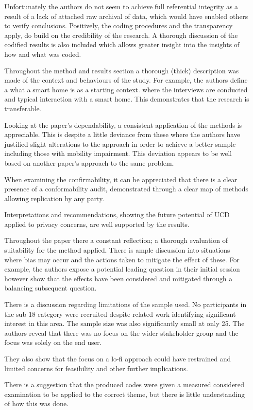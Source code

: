 Unfortunately the authors do not seem to achieve full referential integrity as a result of a lack of attached raw archival of data, which would have enabled others to verify conclusions. Positively, the coding procedures and the transparency apply, do build on the credibility of the research. A thorough discussion of the codified results is also included which allows greater insight into the insights of how and what was coded.


Throughout the method and results section a thorough (thick) description was made of the context and behaviours of the study. For example, the authors define a what a smart home is as a starting context. where the interviews are conducted and typical interaction with a smart home. This demonstrates that the research is transferable.


Looking at the paper's dependability, a consistent application of the methods is appreciable. This is despite a little deviance from these where the authors have justified slight alterations to the approach in order to achieve a better sample including those with mobility impairment. This deviation appears to be well based on another paper's approach to the same problem.


When examining the confirmability, it can be appreciated that there is a clear presence of a conformability audit, demonstrated through a clear map of methods allowing replication by any party.  

Interpretations and recommendations, showing the future potential of UCD applied to privacy concerns, are well supported by the results.  

Throughout the paper there a constant reflection; a thorough evaluation of suitability for the method applied. There is ample discussion into situations where bias may occur and the actions taken to mitigate the effect of these. For example, the authors expose a potential leading question in their initial session however show that the effects have been considered and mitigated through a balancing subsequent question. 

There is a discussion regarding limitations of the sample used. No participants in the sub-18 category were recruited despite related work identifying significant interest in this area. The sample size was also significantly small at only 25. The authors reveal that there was no focus on the wider stakeholder group and the focus was solely on the end user. 

They also show that the focus on a lo-fi approach could have restrained and limited concerns for feasibility and other further implications.

There is a suggestion that the produced codes were given a measured considered examination to be applied to the correct theme, but there is little understanding of how this was done.

\newpage